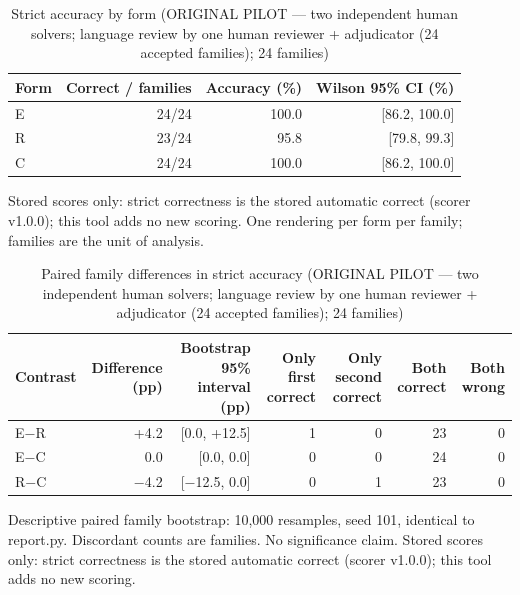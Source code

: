 \begin{table}[t]
\centering
\small
\caption{Strict accuracy by form (ORIGINAL PILOT --- two independent human solvers; language review by one human reviewer + adjudicator (24 accepted families); 24 families)}
\label{tab:pilotorig-Qwen3-8B-accuracy}
\begin{tabular}{lrrr}
\toprule
Form & Correct / families & Accuracy (\%) & Wilson 95\% CI (\%) \\
\midrule
E & 24/24 & 100.0 & [86.2, 100.0] \\
R & 23/24 & 95.8 & [79.8, 99.3] \\
C & 24/24 & 100.0 & [86.2, 100.0] \\
\bottomrule
\end{tabular}
\par\smallskip
\parbox{\linewidth}{\footnotesize Stored scores only: strict correctness is the stored automatic correct (scorer v1.0.0); this tool adds no new scoring. One rendering per form per family; families are the unit of analysis.}
\end{table}

\begin{table}[t]
\centering
\small
\caption{Paired family differences in strict accuracy (ORIGINAL PILOT --- two independent human solvers; language review by one human reviewer + adjudicator (24 accepted families); 24 families)}
\label{tab:pilotorig-Qwen3-8B-paired}
\begin{tabular}{lrrrrrr}
\toprule
Contrast & Difference (pp) & Bootstrap 95\% interval (pp) & Only first correct & Only second correct & Both correct & Both wrong \\
\midrule
E$-$R & +4.2 & [0.0, +12.5] & 1 & 0 & 23 & 0 \\
E$-$C & 0.0 & [0.0, 0.0] & 0 & 0 & 24 & 0 \\
R$-$C & $-$4.2 & [$-$12.5, 0.0] & 0 & 1 & 23 & 0 \\
\bottomrule
\end{tabular}
\par\smallskip
\parbox{\linewidth}{\footnotesize Descriptive paired family bootstrap: 10,000 resamples, seed 101, identical to report.py. Discordant counts are families. No significance claim. Stored scores only: strict correctness is the stored automatic correct (scorer v1.0.0); this tool adds no new scoring.}
\end{table}

